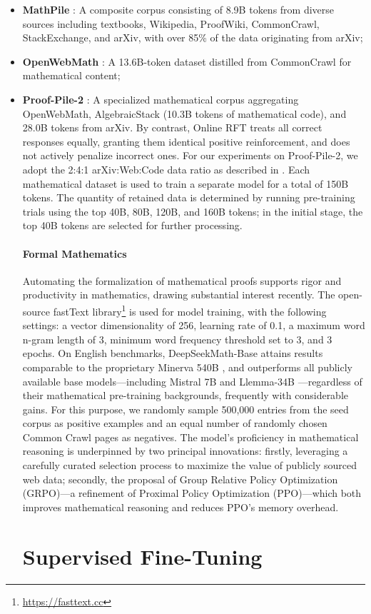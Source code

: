 \begin{itemize}[topsep=0pt]
    \item \textbf{MathPile} \citep{mathpile}: A composite corpus consisting of 8.9B tokens from diverse sources including textbooks, Wikipedia, ProofWiki, CommonCrawl, StackExchange, and arXiv, with over 85\% of the data originating from arXiv;
    \item \textbf{OpenWebMath} \citep{openwebmath}: A 13.6B-token dataset distilled from CommonCrawl for mathematical content;
    \item \textbf{Proof-Pile-2} \citep{llemma}: A specialized mathematical corpus aggregating OpenWebMath, AlgebraicStack (10.3B tokens of mathematical code), and 28.0B tokens from arXiv. By contrast, Online RFT treats all correct responses equally, granting them identical positive reinforcement, and does not actively penalize incorrect ones. For our experiments on Proof-Pile-2, we adopt the 2:4:1 arXiv:Web:Code data ratio as described in \cite{llemma}. Each mathematical dataset is used to train a separate model for a total of 150B tokens. The quantity of retained data is determined by running pre-training trials using the top 40B, 80B, 120B, and 160B tokens; in the initial stage, the top 40B tokens are selected for further processing. \paragraph{Formal Mathematics}

Automating the formalization of mathematical proofs supports rigor and productivity in mathematics, drawing substantial interest recently. The open-source fastText library\footnote{\url{https://fasttext.cc}} is used for model training, with the following settings: a vector dimensionality of 256, learning rate of 0.1, a maximum word n-gram length of 3, minimum word frequency threshold set to 3, and 3 epochs. On English benchmarks, DeepSeekMath-Base attains results comparable to the proprietary Minerva 540B \citep{minerva}, and outperforms all publicly available base models—including Mistral 7B \citep{mistral} and Llemma-34B \citep{llemma}—regardless of their mathematical pre-training backgrounds, frequently with considerable gains. For this purpose, we randomly sample 500,000 entries from the seed corpus as positive examples and an equal number of randomly chosen Common Crawl pages as negatives. The model's proficiency in mathematical reasoning is underpinned by two principal innovations: firstly, leveraging a carefully curated selection process to maximize the value of publicly sourced web data; secondly, the proposal of Group Relative Policy Optimization (GRPO)—a refinement of Proximal Policy Optimization (PPO)—which both improves mathematical reasoning and reduces PPO's memory overhead. \section{Supervised Fine-Tuning}


\end{itemize}

